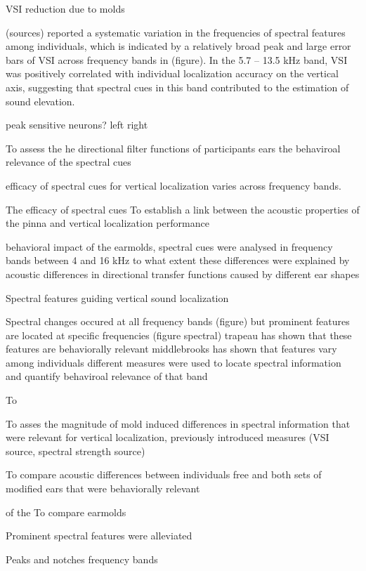 VSI reduction due to molds 

(sources) reported a systematic variation in the frequencies of spectral features among individuals, which is indicated by a relatively broad peak and large error bars of VSI across frequency bands in (figure). In the 5.7 – 13.5 kHz band, VSI was positively correlated with individual localization accuracy on the vertical axis, suggesting that spectral cues in this band contributed to the estimation of sound elevation. 



\newpage
 peak sensitive neurons?
 left right
 
To assess the 
he directional filter functions of participants ears 
the behaviroal relevance of the spectral cues

efficacy of spectral cues for vertical localization varies across frequency bands. 

The efficacy of spectral cues 
To establish a link between the acoustic properties of the pinna and vertical localization performance 

behavioral impact of the earmolds, spectral cues were analysed in frequency bands between 4 and 16 kHz 
to what extent these differences were explained by acoustic differences in directional transfer functions caused by different ear shapes

Spectral features guiding vertical sound localization 

Spectral changes occured at all frequency bands (figure)
but prominent features are located at specific frequencies (figure spectral)
trapeau has shown that these features are behaviorally relevant
middlebrooks has shown that features vary among individuals
different measures were used to locate spectral information and quantify behaviroal relevance of that band 



To 

To asses the magnitude of mold induced differences in spectral information that were relevant for vertical localization, previously introduced measures (VSI source, spectral strength source) 


To compare acoustic differences between individuals free and both sets of modified ears that were behaviorally relevant

 of the To compare earmolds

Prominent spectral features were alleviated 

Peaks and notches frequency bands

